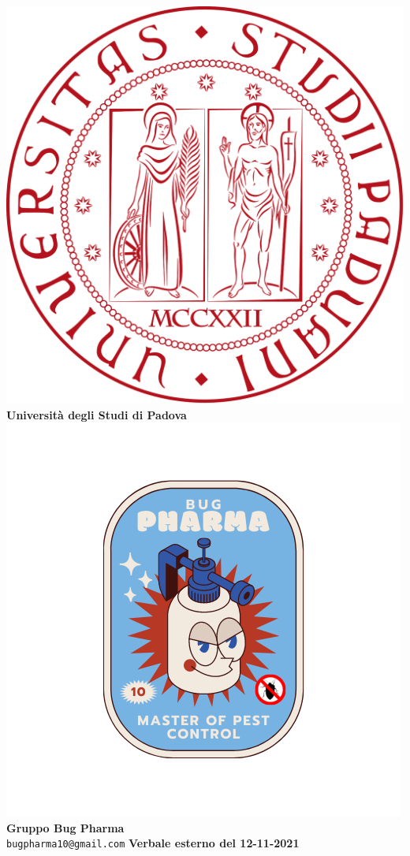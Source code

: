 \documentclass[11pt]{article}
\begin{document}
	\thispagestyle{empty}
	\begin{titlepage}
		\begin{center}
			\includegraphics[scale = 0.05]{../../Res/logo_unipd.png}\\
			\bigskip
			\large \textbf{Università degli Studi di Padova} \\
			\vfill
			\includegraphics[scale = 0.7]{../../Res/BugPharma_Logo.png}\\
			\huge \textbf{Gruppo Bug Pharma} \\
			\vfill
			\large \texttt{bugpharma10@gmail.com}
			\vfill
			\Huge \textbf{Verbale esterno del 12-11-2021}\\
			

\end{center}
\end{titlepage}
\end{document}
